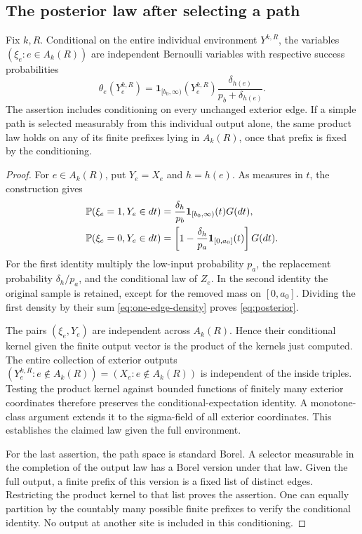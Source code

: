 \subsection{The posterior law after selecting a path}

\begin{lemma}\label{lem:posterior}
Fix $k,R$.  Conditional on the entire individual environment $Y^{k,R}$,
the variables $(\xi_e:e\in A_k(R))$ are independent Bernoulli variables
with respective success probabilities
\begin{equation}\label{eq:posterior}
 \theta_e(Y^{k,R}_e)
 =\mathbf1_{[b_0,\infty)}(Y^{k,R}_e)
       \frac{\delta_{h(e)}}{p_b+\delta_{h(e)}}.
\end{equation}
The assertion includes conditioning on every unchanged exterior edge.
If a simple path is selected measurably from this individual output
alone, the same product law holds on any of its finite prefixes lying
in $A_k(R)$, once that prefix is fixed by the conditioning.
\end{lemma}

\begin{proof}
For $e\in A_k(R)$, put $Y_e=\widehat X_e$ and $h=h(e)$.
As measures in $t$, the construction gives
\begin{align}
 \mathbb P(\xi_e=1,Y_e\in dt)
    &=\frac{\delta_h}{p_b}\mathbf1_{[b_0,\infty)}(t)G(dt),
       \label{eq:posterior-joint-one}\\
 \mathbb P(\xi_e=0,Y_e\in dt)
    &=\left[1-\frac{\delta_h}{p_a}\mathbf1_{[0,a_0]}(t)\right]G(dt).
       \label{eq:posterior-joint-zero}
\end{align}
For the first identity multiply the low-input probability $p_a$, the
replacement probability $\delta_h/p_a$, and the conditional law of
$Z_e$.  In the second identity the original sample is retained, except
for the removed mass on $[0,a_0]$.  Dividing the first density by their
sum \eqref{eq:one-edge-density} proves \eqref{eq:posterior}.

The pairs $(\xi_e,Y_e)$ are independent across $A_k(R)$.  Hence their
conditional kernel given the finite output vector is the product of
the kernels just computed.  The entire collection of exterior outputs
$(Y^{k,R}_e:e\notin A_k(R))=(X_e:e\notin A_k(R))$ is independent of
the inside triples.  Testing the product kernel against bounded
functions of finitely many exterior coordinates therefore preserves
the conditional-expectation identity.  A monotone-class argument extends
it to the sigma-field of all exterior coordinates.  This establishes
the claimed law given the full environment.

For the last assertion, the path space is standard Borel.  A selector
measurable in the completion of the output law has a Borel version under
that law.  Given the full output, a finite prefix of this version is a
fixed list of distinct edges.  Restricting the product kernel to that
list proves the assertion.  One can equally partition by the countably
many possible finite prefixes to verify the conditional identity.
No output at another site is included in this conditioning.
\end{proof}

